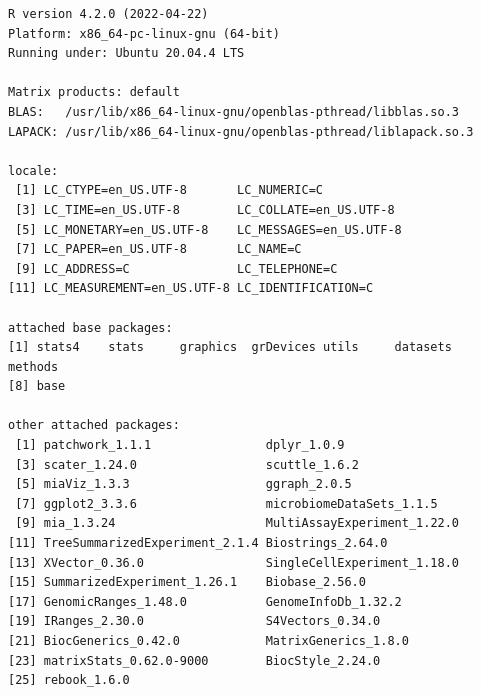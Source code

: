 \documentclass[
]{book}
\begin{document}
\begin{verbatim}
R version 4.2.0 (2022-04-22)
Platform: x86_64-pc-linux-gnu (64-bit)
Running under: Ubuntu 20.04.4 LTS

Matrix products: default
BLAS:   /usr/lib/x86_64-linux-gnu/openblas-pthread/libblas.so.3
LAPACK: /usr/lib/x86_64-linux-gnu/openblas-pthread/liblapack.so.3

locale:
 [1] LC_CTYPE=en_US.UTF-8       LC_NUMERIC=C              
 [3] LC_TIME=en_US.UTF-8        LC_COLLATE=en_US.UTF-8    
 [5] LC_MONETARY=en_US.UTF-8    LC_MESSAGES=en_US.UTF-8   
 [7] LC_PAPER=en_US.UTF-8       LC_NAME=C                 
 [9] LC_ADDRESS=C               LC_TELEPHONE=C            
[11] LC_MEASUREMENT=en_US.UTF-8 LC_IDENTIFICATION=C       

attached base packages:
[1] stats4    stats     graphics  grDevices utils     datasets  methods  
[8] base     

other attached packages:
 [1] patchwork_1.1.1                dplyr_1.0.9                   
 [3] scater_1.24.0                  scuttle_1.6.2                 
 [5] miaViz_1.3.3                   ggraph_2.0.5                  
 [7] ggplot2_3.3.6                  microbiomeDataSets_1.1.5      
 [9] mia_1.3.24                     MultiAssayExperiment_1.22.0   
[11] TreeSummarizedExperiment_2.1.4 Biostrings_2.64.0             
[13] XVector_0.36.0                 SingleCellExperiment_1.18.0   
[15] SummarizedExperiment_1.26.1    Biobase_2.56.0                
[17] GenomicRanges_1.48.0           GenomeInfoDb_1.32.2           
[19] IRanges_2.30.0                 S4Vectors_0.34.0              
[21] BiocGenerics_0.42.0            MatrixGenerics_1.8.0          
[23] matrixStats_0.62.0-9000        BiocStyle_2.24.0              
[25] rebook_1.6.0                  


\end{verbatim}
\end{document}
